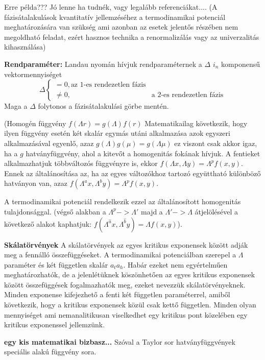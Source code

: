 Erre példa??? Jó lenne ha tudnék, vagy legalább referenciákat....
(A fázisátalakulások kvantitatív jellemzéséhez a termodinamikai potenciál meghatározására van szükség ami azonban az esetek jelentős részében nem megoldható feladat, ezért hasznos technika a renormalizálás vagy az univerzalitás kihasználása)

{\bf Rendparaméter:} Landau nyomán hívjuk rendparaméternek a $\Delta$ $i_n$ komponensű vektormennyiséget
\begin{equation}
\Delta  
	\begin{cases}
		= 0, \mbox{az 1-es rendezetlen fázis}\\
	  \neq 0, & \mbox{a 2-es rendezetlen fázis}
	\end{cases}
\end{equation}
Maga a $\Delta$ folytonos a fázisátalakulási görbe mentén.

(Homogén függvény $f(\Lambda r)=g(\Lambda)f(r)$  Matematikailag következik, hogy ilyen függvény esetén két skalár egymás utáni alkalmazása azok egyszeri alkalmazásával egyenlő, azaz $g(\Lambda)g(\mu)=g(\Lambda\mu)$ ez viszont csak akkor igaz, ha a $g$ hatványfüggvény, ahol a kitevőt a homogenitás fokának hívjuk. A fentieket alkalmazhatjuk többváltozós függvényre is, ekkor $f(\Lambda x, \Lambda y)=\Lambda^p f(x,y)$. Ennek az általánosítása az, ha az egyes változókhoz tartozó együttható különböző hatványon van, azaz $f(\Lambda^a x, \Lambda^b y)=\Lambda^p f(x,y)$.

A termodinamikai potenciál rendelkezik ezzel az általánosított homogenitás tulajdonsággal. (végső alakban a $\Lambda^p -> \Lambda '$ majd a $\Lambda ' -> \Lambda$ átjelölésével a következő alakot kaphatjuk: $f(\Lambda^{\hat a} x, \Lambda^{\hat b} y)=\Lambda f(x,y)$).

{\bf Skálatörvények } A skálatörvények az egyes kritikus exponensek között adják meg a fennálló összefüggéseket.  A termodinamikai potenciálban szerepel a $\Lambda$ paraméter és két független skalár $a_t a_h$. Habár ezeket nem egyértelműen meghatározhatók, de a jelenlétüknek köszönhetően az egyes kritikus exponensek között összefüggések fogalmazhatók meg, ezeket nevezzük skálatörvényeknek. Minden exponense kifejezhető a fenti két független paraméterrel, amiből következik, hogy a kritikus exponensek közül csak kettő független. Minden olyan mennyiséget ami nemanalitikusan viselkedhet egy kritikus pont közelében egy kritikus exponenssel jellemzünk.

{\bf egy kis matematikai bizbasz... }
Szóval a Taylor sor hatványfüggvények speciális alakú függvény sora.

